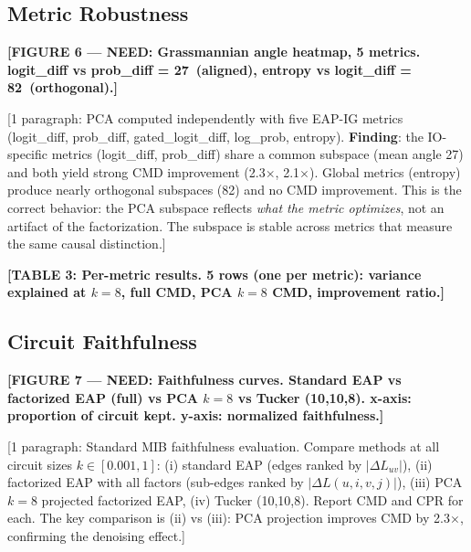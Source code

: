 \documentclass[11pt]{article}
\begin{document}

\subsection{Metric Robustness}

\textbf{[FIGURE 6 --- NEED: Grassmannian angle heatmap, 5 metrics.
logit\_diff vs prob\_diff = 27\textdegree\ (aligned),
entropy vs logit\_diff = 82\textdegree\ (orthogonal).]}

[1 paragraph: PCA computed independently with five EAP-IG metrics
(logit\_diff, prob\_diff, gated\_logit\_diff, log\_prob, entropy).
\textbf{Finding}: the IO-specific metrics (logit\_diff, prob\_diff) share
a common subspace (mean angle 27\textdegree) and both yield strong CMD
improvement (2.3$\times$, 2.1$\times$). Global metrics (entropy) produce
nearly orthogonal subspaces (82\textdegree) and no CMD improvement.
This is the correct behavior: the PCA subspace reflects \emph{what the
metric optimizes}, not an artifact of the factorization. The subspace
is stable across metrics that measure the same causal distinction.]

\textbf{[TABLE 3: Per-metric results. 5 rows (one per metric):
variance explained at $k=8$, full CMD, PCA $k=8$ CMD, improvement ratio.]}

\subsection{Circuit Faithfulness}

\textbf{[FIGURE 7 --- NEED: Faithfulness curves. Standard EAP vs factorized
EAP (full) vs PCA $k=8$ vs Tucker (10,10,8). x-axis: proportion of circuit
kept. y-axis: normalized faithfulness.]}

[1 paragraph: Standard MIB faithfulness evaluation. Compare methods
at all circuit sizes $k \in [0.001, 1]$: (i) standard EAP (edges ranked
by $|\Delta L_{uv}|$), (ii) factorized EAP with all factors
(sub-edges ranked by $|\Delta L(u,i,v,j)|$), (iii) PCA $k=8$ projected
factorized EAP, (iv) Tucker (10,10,8). Report CMD and CPR
for each. The key comparison is (ii) vs (iii): PCA projection improves
CMD by 2.3$\times$, confirming the denoising effect.]
\end{document}
